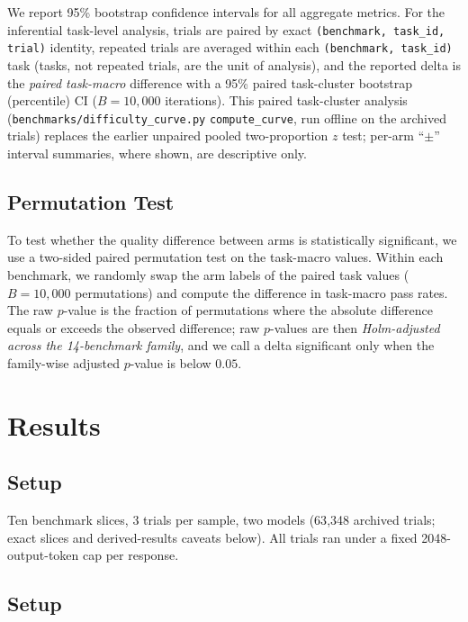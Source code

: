 \documentclass[11pt,a4paper]{article}
\begin{document}
We report 95\% bootstrap confidence intervals for all aggregate metrics.
For the inferential task-level analysis, trials are paired by exact
\texttt{(benchmark, task\_id, trial)} identity, repeated trials are averaged
within each \texttt{(benchmark, task\_id)} task (tasks, not repeated trials,
are the unit of analysis), and the reported delta is the \emph{paired
task-macro} difference with a 95\% paired task-cluster bootstrap (percentile)
CI ($B = 10{,}000$ iterations). This paired task-cluster analysis
(\texttt{benchmarks/difficulty\_curve.py} \texttt{compute\_curve}, run
offline on the archived trials) replaces the earlier unpaired pooled
two-proportion $z$ test; per-arm ``$\pm$'' interval summaries, where shown,
are descriptive only.

\subsection{Permutation Test}
\label{subsec:permutation}

To test whether the quality difference between arms is statistically significant, we use a two-sided paired permutation test on the task-macro values.
Within each benchmark, we randomly swap the arm labels of the paired task values ($B = 10{,}000$ permutations) and compute the difference in task-macro pass rates.
The raw $p$-value is the fraction of permutations where the absolute difference equals or exceeds the observed difference; raw $p$-values are then \emph{Holm-adjusted across the 14-benchmark family}, and we call a delta significant only when the family-wise adjusted $p$-value is below $0.05$.

\section{Results}
\label{sec:results}

\subsection{Setup}

Ten benchmark slices, 3 trials per sample, two models (63{,}348 archived
trials; exact slices and derived-results caveats below). All trials ran under a
fixed 2048-output-token cap per response.

\subsection{Setup}
\end{document}
